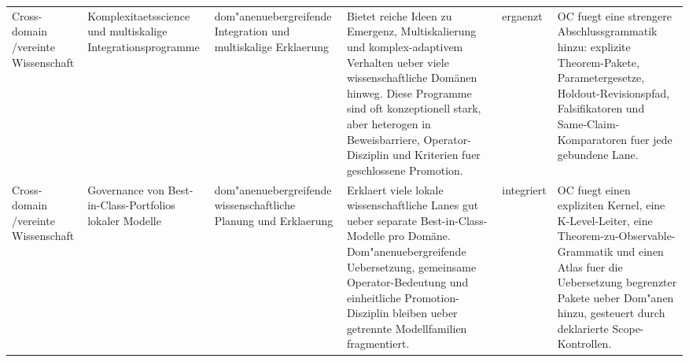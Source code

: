 \begin{longtable}{@{}L{0.09\textwidth}L{0.14\textwidth}L{0.12\textwidth}L{0.23\textwidth}L{0.12\textwidth}L{0.22\textwidth}@{}}
Cross-domain /\allowbreak vereinte Wissenschaft & Komplexitaetsscience und multiskalige Integrationsprogramme & dom"anenuebergreifende Integration und multiskalige Erklaerung & Bietet reiche Ideen zu Emergenz, Multiskalierung und komplex-adaptivem Verhalten ueber viele wissenschaftliche Domänen hinweg. \allowbreak Diese Programme sind oft konzeptionell stark, aber heterogen in Beweisbarriere, Operator-Disziplin und Kriterien fuer geschlossene Promotion. & ergaenzt & OC fuegt eine strengere Abschlussgrammatik hinzu: explizite Theorem-Pakete, Parametergesetze, Holdout-Revisionspfad, Falsifikatoren und Same-Claim-Komparatoren fuer jede gebundene Lane. \\
Cross-domain /\allowbreak vereinte Wissenschaft & Governance von Best-in-Class-Portfolios lokaler Modelle & dom"anenuebergreifende wissenschaftliche Planung und Erklaerung & Erklaert viele lokale wissenschaftliche Lanes gut ueber separate Best-in-Class-Modelle pro Domäne. \allowbreak Dom"anenuebergreifende Uebersetzung, gemeinsame Operator-Bedeutung und einheitliche Promotion-Disziplin bleiben ueber getrennte Modellfamilien fragmentiert. & integriert & OC fuegt einen expliziten Kernel, eine K-Level-Leiter, eine Theorem-zu-Observable-Grammatik und einen Atlas fuer die Uebersetzung begrenzter Pakete ueber Dom"anen hinzu, gesteuert durch deklarierte Scope-Kontrollen. \\
\bottomrule
\end{longtable}

